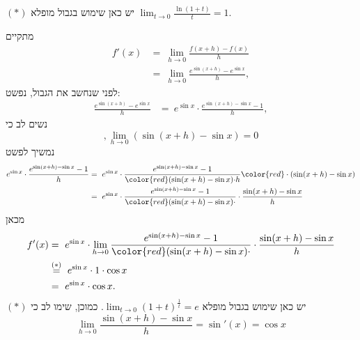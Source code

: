 \begin{solbox}
$(\ast)$
יש כאן שימוש בגבול מופלא
$\displaystyle\lim_{t\to0}\frac{\ln(1+t)}{t}=1$.
\item
מתקיים
\begin{align*}
    f'(x)&=\ \lim_{h\to0}\frac{f(x+h)-f(x)}{h}\\
    &=\ \lim_{h\to0}\frac{e^{\sin(x+h)}-e^{\sin x}}{h},
\end{align*}
לפני שנחשב את הגבול, נפשט:
\begin{align*}
    \frac{e^{\sin(x+h)}-e^{\sin x}}{h}&=\ e^{\sin x}\cdot\frac{e^{\sin(x+h)-\sin x}-1}{h},
\end{align*}
נשים לב כי
$$,\lim_{h\to0}(\sin(x+h)-\sin x)=0$$
נמשיך לפשט
\begin{align*}
    e^{\sin x}\cdot\frac{e^{\sin(x+h)-\sin x}-1}{h}&=\ e^{\sin x}\cdot\frac{e^{\sin(x+h)-\sin x}-1}{{\color{red}(\sin(x+h)-\sin x)\cdot}h}{\color{red}\cdot(\sin(x+h)-\sin x)}\\
    &=\ e^{\sin x}\cdot\frac{e^{\sin(x+h)-\sin x}-1}{{\color{red}(\sin(x+h)-\sin x)\cdot}}\cdot\frac{{\sin(x+h)-\sin x}}{h}
\end{align*}
מכאן
\begin{align*}
    f'(x)&=\ e^{\sin x}\cdot\lim_{h\to0}\frac{e^{\sin(x+h)-\sin x}-1}{{\color{red}(\sin(x+h)-\sin x)\cdot}}\cdot\frac{{\sin(x+h)-\sin x}}{h}\\
    &\overset{(\ast)}{=}\ e^{\sin x}\cdot1\cdot\cos x\\
    &=\ e^{\sin x}\cdot\cos x.
\end{align*}
 $(\ast)$
 יש כאן שימוש בגבול מופלא
 $\lim_{t\to0}(1+t)^{\frac{1}{t}}=e$.
 כמוכן, שימו לב כי
 $$\displaystyle\lim_{h\to 0}\frac{{\sin(x+h)-\sin x}}{h}=\sin'(x)=\cos x$$
\eE
\end{solbox}
\fi
